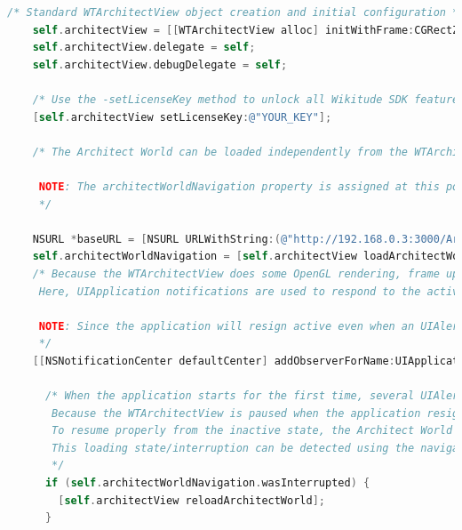 \documentclass[thesis=M,english]{FITthesis}[2012/10/20]
\begin{document}
\begin{lstlisting}[language=C]
    /* Standard WTArchitectView object creation and initial configuration */
    self.architectView = [[WTArchitectView alloc] initWithFrame:CGRectZero motionManager:nil];
    self.architectView.delegate = self;
    self.architectView.debugDelegate = self;
    
    /* Use the -setLicenseKey method to unlock all Wikitude SDK features that you bought with your license. */
    [self.architectView setLicenseKey:@"YOUR_KEY"];
    
    /* The Architect World can be loaded independently from the WTArchitectView rendering.
     
     NOTE: The architectWorldNavigation property is assigned at this point. The navigation object is valid until another Architect World is loaded.
     */
    
    NSURL *baseURL = [NSURL URLWithString:(@"http://192.168.0.3:3000/ArchitectWorld/index.html")];
    self.architectWorldNavigation = [self.architectView loadArchitectWorldFromURL:baseURL withRequiredFeatures:WTFeature_Geo];
    /* Because the WTArchitectView does some OpenGL rendering, frame updates have to be suspended and resumend when the application changes it's active state.
     Here, UIApplication notifications are used to respond to the active state changes.
     
     NOTE: Since the application will resign active even when an UIAlert is shown, some special handling is implemented in the UIApplicationDidBecomeActiveNotification.
     */
    [[NSNotificationCenter defaultCenter] addObserverForName:UIApplicationDidBecomeActiveNotification object:nil queue:[NSOperationQueue mainQueue] usingBlock:^(NSNotification *note) {
      
      /* When the application starts for the first time, several UIAlert's might be shown to ask the user for camera and/or GPS access.
       Because the WTArchitectView is paused when the application resigns active (See line 86), also Architect JavaScript evaluation is interrupted.
       To resume properly from the inactive state, the Architect World has to be reloaded if and only if an active Architect World load request was active at the time the application resigned active.
       This loading state/interruption can be detected using the navigation object that was returned from the -loadArchitectWorldFromURL:withRequiredFeatures method.
       */
      if (self.architectWorldNavigation.wasInterrupted) {
        [self.architectView reloadArchitectWorld];
      }
      

\end{lstlisting}
\end{document}
